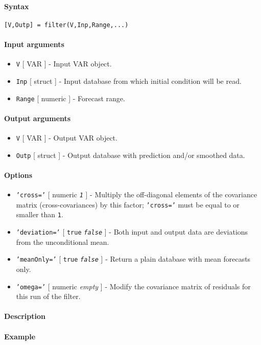 


	\paragraph{Syntax}\label{syntax}

\begin{verbatim}
[V,Outp] = filter(V,Inp,Range,...)
\end{verbatim}

\paragraph{Input arguments}\label{input-arguments}

\begin{itemize}
\item
  \texttt{V} {[} VAR {]} - Input VAR object.
\item
  \texttt{Inp} {[} struct {]} - Input database from which initial
  condition will be read.
\item
  \texttt{Range} {[} numeric {]} - Forecast range.
\end{itemize}

\paragraph{Output arguments}\label{output-arguments}

\begin{itemize}
\item
  \texttt{V} {[} VAR {]} - Output VAR object.
\item
  \texttt{Outp} {[} struct {]} - Output database with prediction and/or
  smoothed data.
\end{itemize}

\paragraph{Options}\label{options}

\begin{itemize}
\item
  \texttt{'cross='} {[} numeric \textbar{} \emph{\texttt{1}} {]} -
  Multiply the off-diagonal elements of the covariance matrix
  (cross-covariances) by this factor; \texttt{'cross='} must be equal to
  or smaller than \texttt{1}.
\item
  \texttt{'deviation='} {[} \texttt{true} \textbar{}
  \emph{\texttt{false}} {]} - Both input and output data are deviations
  from the unconditional mean.
\item
  \texttt{'meanOnly='} {[} \texttt{true} \textbar{}
  \emph{\texttt{false}} {]} - Return a plain database with mean
  forecasts only.
\item
  \texttt{'omega='} {[} numeric \textbar{} \emph{empty} {]} - Modify the
  covariance matrix of residuals for this run of the filter.
\end{itemize}

\paragraph{Description}\label{description}

\paragraph{Example}\label{example}


